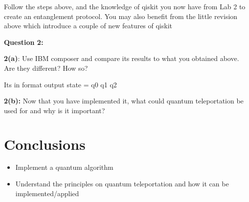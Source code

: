 Follow the steps above, and the knowledge of qiskit you now have from Lab 2 to create an entanglement protocol. You may also benefit from the little revision above which introduce a couple of new features of qiskit

\textbf{Question 2:}

\textbf{2(a)}: Use IBM composer and compare its results to what you obtained above. Are they different? How so?

Its in format output state = q0 q1 q2

\textbf{2(b):} Now that you have implemented it, what could quantum teleportation be used for and why is it important?

\section{Conclusions}

\begin{itemize}
    \item Implement a quantum algorithm
    \item Understand the principles on quantum teleportation and how it can be implemented/applied
\end{itemize}